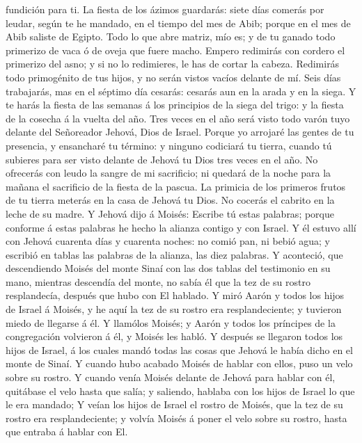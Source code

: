 fundición para ti.  La fiesta de los ázimos guardarás:
siete días comerás por leudar, según te he mandado, en el tiempo del mes
de Abib; porque en el mes de Abib saliste de Egipto.  Todo
lo que abre matriz, mío es; y de tu ganado todo primerizo de vaca ó de
oveja que fuere macho.  Empero redimirás con cordero el
primerizo del asno; y si no lo redimieres, le has de cortar la cabeza.
Redimirás todo primogénito de tus hijos, y no serán vistos vacíos
delante de mí.  Seis días trabajarás, mas en el séptimo día
cesarás: cesarás aun en la arada y en la siega.  Y te harás
la fiesta de las semanas á los principios de la siega del trigo: y la
fiesta de la cosecha á la vuelta del año.  Tres veces en el
año será visto todo varón tuyo delante del Señoreador Jehová, Dios de
Israel.  Porque yo arrojaré las gentes de tu presencia, y
ensancharé tu término: y ninguno codiciará tu tierra, cuando tú subieres
para ser visto delante de Jehová tu Dios tres veces en el año.
 No ofrecerás con leudo la sangre de mi sacrificio; ni
quedará de la noche para la mañana el sacrificio de la fiesta de la
pascua.  La primicia de los primeros frutos de tu tierra
meterás en la casa de Jehová tu Dios. No cocerás el cabrito en la leche
de su madre.  Y Jehová dijo á Moisés: Escribe tú estas
palabras; porque conforme á estas palabras he hecho la alianza contigo y
con Israel.  Y él estuvo allí con Jehová cuarenta días y
cuarenta noches: no comió pan, ni bebió agua; y escribió en tablas las
palabras de la alianza, las diez palabras.  Y aconteció,
que descendiendo Moisés del monte Sinaí con las dos tablas del
testimonio en su mano, mientras descendía del monte, no sabía él que la
tez de su rostro resplandecía, después que hubo con El hablado.
 Y miró Aarón y todos los hijos de Israel á Moisés, y he
aquí la tez de su rostro era resplandeciente; y tuvieron miedo de
llegarse á él.  Y llamólos Moisés; y Aarón y todos los
príncipes de la congregación volvieron á él, y Moisés les habló.
 Y después se llegaron todos los hijos de Israel, á los
cuales mandó todas las cosas que Jehová le había dicho en el monte de
Sinaí.  Y cuando hubo acabado Moisés de hablar con ellos,
puso un velo sobre su rostro.  Y cuando venía Moisés
delante de Jehová para hablar con él, quitábase el velo hasta que salía;
y saliendo, hablaba con los hijos de Israel lo que le era mandado;
 Y veían los hijos de Israel el rostro de Moisés, que la
tez de su rostro era resplandeciente; y volvía Moisés á poner el velo
sobre su rostro, hasta que entraba á hablar con El.

